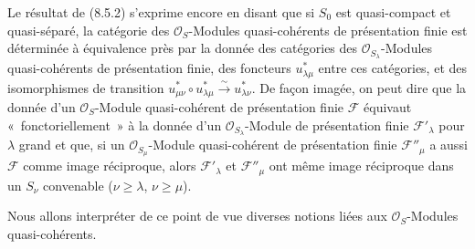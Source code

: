 \begin{env}[8.5.3]
\label{IV.8.5.3-fr}
Le résultat de (8.5.2) s'exprime encore en disant que si $S_0$ est
quasi-compact et quasi-séparé, la catégorie des $\mathcal O_S$-Modules
quasi-cohérents de présentation finie est déterminée à équivalence près par la
donnée des catégories des $\mathcal O_{S_\lambda}$-Modules quasi-cohérents de
présentation finie, des foncteurs $u_{\lambda\mu}^*$ entre ces catégories, et
des isomorphismes de transition
$u_{\mu\nu}^*\circ u_{\lambda\mu}^*\xrightarrow{\sim}u_{\lambda\nu}^*$. De façon
imagée, on peut dire que la donnée d'un $\mathcal O_S$-Module quasi-cohérent de
présentation finie $\mathcal F$ équivaut «~fonctoriellement~» à la donnée d'un
$\mathcal O_{S_\lambda}$-Module de présentation finie $\mathcal F'_\lambda$
pour $\lambda$ grand et que, si un $\mathcal O_{S_\mu}$-Module quasi-cohérent de
présentation finie $\mathcal F''_\mu$ a aussi $\mathcal F$ comme image
réciproque, alors $\mathcal F'_\lambda$ et $\mathcal F''_\mu$ ont même image
réciproque dans un $S_\nu$ convenable ($\nu\geq\lambda$, $\nu\geq\mu$).

Nous allons interpréter de ce point de vue diverses notions liées aux
$\mathcal O_S$-Modules quasi-cohérents.
\end{env}

